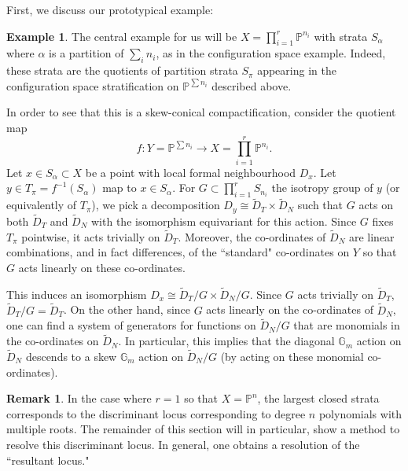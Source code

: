 \documentclass[10pt]{article}
\theoremstyle{plain}
\theoremstyle{definition}
\newtheorem{example}[theorem]{Example}
\newtheorem{remark}[theorem]{Remark}
\numberwithin{equation}{section}
\begin{document}
First, we discuss our prototypical example:

\begin{example}
    The central example for us will be $X = \prod_{i=1}^r\mathbb P^{n_i}$ with strata $S_\alpha$ where $\alpha$ is a partition of $\sum_i n_i$, as in the configuration space example. Indeed, these strata are the quotients of partition strata $S_\pi$ appearing in the configuration space stratification on $\mathbb P^{\sum n_i}$ described above. 
\end{example}

In order to see that this is a skew-conical compactification, consider the quotient map
\[f: Y = \mathbb P^{\sum n_i} \to X = \prod_{i=1}^r\mathbb P^{n_i}.\]
Let $x \in S_\alpha \subset X$ be a point with local formal neighbourhood $D_x$. Let $y \in T_\pi = f^{-1}(S_\alpha)$ map to $x \in S_\alpha$. For $G \subset \prod_{i=1}^rS_{n_i}$ the isotropy group of $y$ (or equivalently of $T_\pi$), we pick a decomposition $D_y \cong \tilde D_T \times \tilde D_N$ such that $G$ acts on both $\tilde D_T$ and $\tilde D_N$ with the isomorphism equivariant for this action. Since $G$ fixes $T_\pi$ pointwise, it acts trivially on $\tilde D_T$. Moreover, the co-ordinates of $\tilde D_N$ are linear combinations, and in fact differences, of the ``standard" co-ordinates on $Y$ so that $G$ acts linearly on these co-ordinates.

This induces an isomorphism $D_x \cong \tilde{D}_T/G\times \tilde D_N/G$. Since $G$ acts trivially on $\tilde D_T$, $\tilde D_T/G = \tilde D_T$. On the other hand, since $G$ acts linearly on the co-ordinates of $\tilde D_N$, one can find a system of generators for functions on $\tilde D_N/G$ that are monomials in the co-ordinates on $\tilde D_N$. In particular, this implies that the diagonal $\mathbb G_m$ action on $\tilde D_N$ descends to a skew $\mathbb G_m$ action on $\tilde D_N/G$ (by acting on these monomial co-ordinates).

\begin{remark}\label{rmk: resolving discriminant locus}
    In the case where $r=1$ so that $X= \mathbb P^n$, the largest closed strata corresponds to the discriminant locus corresponding to degree $n$ polynomials with multiple roots. The remainder of this section will in particular, show a method to resolve this discriminant locus. In general, one obtains a resolution of the ``resultant locus."
\end{remark}
\end{document}
